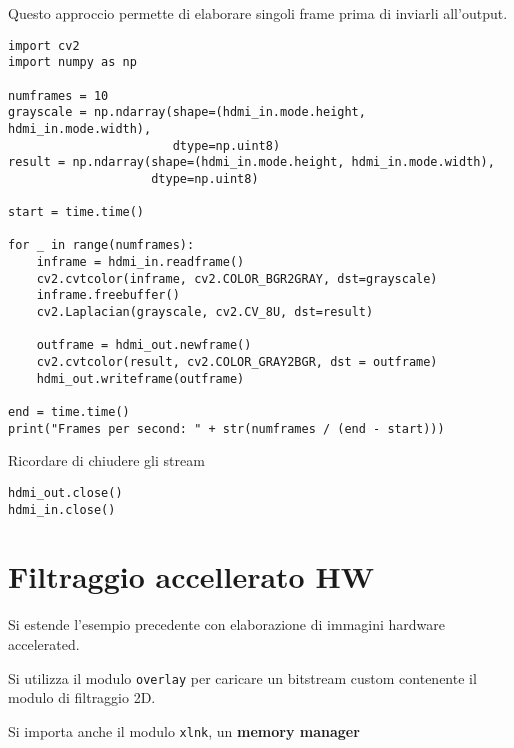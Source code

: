 Questo approccio permette di elaborare singoli frame prima di inviarli all'output.
\vspace{-0.8cm}
\begin{verbatim}
import cv2
import numpy as np

numframes = 10
grayscale = np.ndarray(shape=(hdmi_in.mode.height, hdmi_in.mode.width),
                       dtype=np.uint8)
result = np.ndarray(shape=(hdmi_in.mode.height, hdmi_in.mode.width),
                    dtype=np.uint8)

start = time.time()

for _ in range(numframes):
    inframe = hdmi_in.readframe()
    cv2.cvtcolor(inframe, cv2.COLOR_BGR2GRAY, dst=grayscale)
    inframe.freebuffer()
    cv2.Laplacian(grayscale, cv2.CV_8U, dst=result)

    outframe = hdmi_out.newframe()
    cv2.cvtcolor(result, cv2.COLOR_GRAY2BGR, dst = outframe)
    hdmi_out.writeframe(outframe)

end = time.time()
print("Frames per second: " + str(numframes / (end - start)))
\end{verbatim}

Ricordare di chiudere gli stream
\begin{verbatim}
hdmi_out.close()
hdmi_in.close()
\end{verbatim}

\section{Filtraggio accellerato HW}
Si estende l'esempio precedente con elaborazione di immagini hardware accelerated.

Si utilizza il modulo \texttt{overlay} per caricare un bitstream custom contenente il modulo di filtraggio 2D.

Si importa anche il modulo \texttt{xlnk}, un \textbf{memory manager}





































